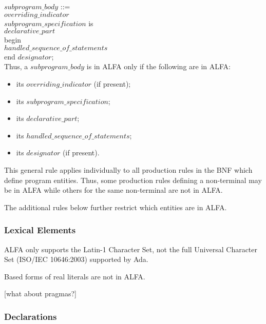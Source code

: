 \documentclass{article}
\newcommand{\bnf}[1]{$\mathit{#1}$}
\begin{document}
\hspace*{1cm}\bnf{subprogram\_body} ::=\\
\hspace*{2cm}\lbrack\bnf{overriding\_indicator}\rbrack\\
\hspace*{2cm}\bnf{subprogram\_specification} is\\
\hspace*{3cm}  \bnf{declarative\_part}\\
\hspace*{2cm}  begin\\
\hspace*{3cm}    \bnf{handled\_sequence\_of\_statements}\\
\hspace*{2cm}  end \lbrack\bnf{designator}\rbrack;\\

Thus, a \bnf{subprogram\_body} is in ALFA only if the following are in ALFA:
\begin{itemize}
\item its \bnf{overriding\_indicator} (if present);
\item its \bnf{subprogram\_specification};
\item its \bnf{declarative\_part};
\item its \bnf{handled\_sequence\_of\_statements};
\item its \bnf{designator} (if present).
\end{itemize}

This general rule applies individually to all production rules in the BNF
which define program entities. Thus, some production rules defining a
non-terminal may be in ALFA while others for the same non-terminal are not in
ALFA.

The additional rules below further restrict which entities are in ALFA. 

\subsubsection{Lexical Elements}

ALFA only supports the Latin-1 Character Set, not the full Universal Character
Set (ISO/IEC 10646:2003) supported by Ada.

Based forms of real literals are not in ALFA.

[what about pragmas?]

\subsubsection{Declarations}
\end{document}
